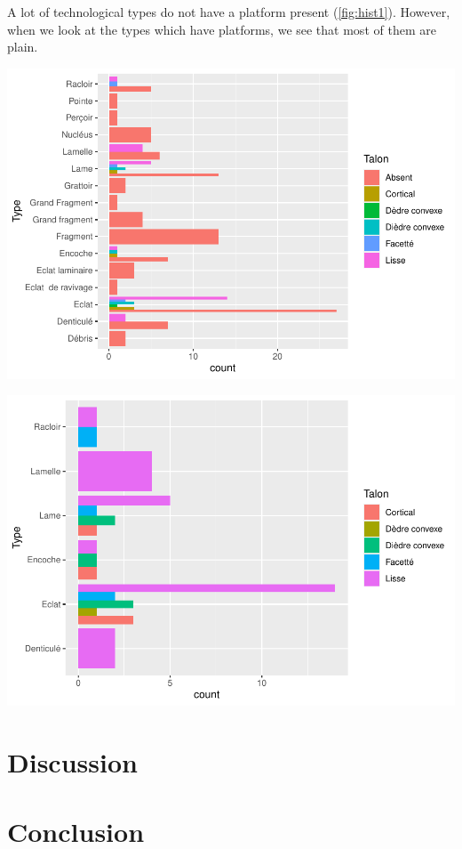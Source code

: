 \documentclass[
]{article}
\begin{document}
A lot of technological types do not have a platform present (\ref{fig:hist1}). However, when we look at the types which have platforms, we see that most of them are plain.

\includegraphics{../figures/hist1-1.pdf}

\includegraphics{../figures/hist2-1.pdf}

\hypertarget{discussion}{%
\section{Discussion}\label{discussion}}

\hypertarget{conclusion}{%
\section{Conclusion}\label{conclusion}}
\end{document}
